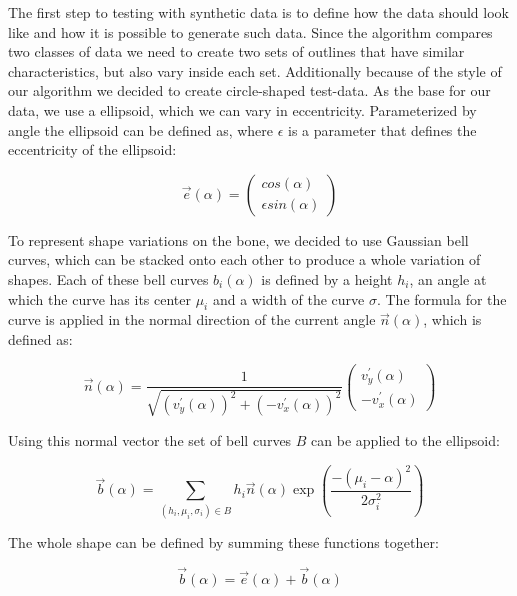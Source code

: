 \documentclass[pdftex,12pt,a4paper]{report}
\begin{document}
The first step to testing with synthetic data is to define how the data should look like and how it is possible to generate such data. Since the algorithm compares two classes of data we need to create two sets of outlines that have similar characteristics, but also vary inside each set. Additionally because of the style of our algorithm we decided to create circle-shaped test-data. As the base for our data, we use a ellipsoid, which we can vary in eccentricity. Parameterized by angle the ellipsoid can be defined as, where $\epsilon$ is a parameter that defines the eccentricity of the ellipsoid:

\begin{equation}
	\vec{e}(\alpha) = \left( \begin{array}{c}
		cos(\alpha) \\
		\epsilon sin(\alpha)
	\end{array} \right) 
\end{equation}

To represent shape variations on the bone, we decided to use Gaussian bell curves, which can be stacked onto each other to produce a whole variation of shapes. Each of these bell curves $b_i(\alpha)$ is defined by a height $h_i$, an angle at which the curve has its center $\mu_i$ and a width of the curve $\sigma$. The formula for the curve is applied in the normal direction of the current angle $\vec{n}(\alpha)$, which is defined as:

\begin{equation}
	\vec{n}(\alpha) = \frac{1}{\sqrt{(v_y^\prime(\alpha))^2 + (-v_x^\prime(\alpha))^2}}\left( \begin{array}{c}
		v_y^\prime(\alpha) \\
		-v_x^\prime(\alpha)
	\end{array} \right)
\end{equation}

Using this normal vector the set of bell curves $B$ can be applied to the ellipsoid:

\begin{equation}
	\vec{b}(\alpha) = \sum_{(h_i, \mu_i, \sigma_i) \in B}h_i \vec{n}(\alpha) \exp\left(\frac{-(\mu_i - \alpha)^2}{2 \sigma_i^2} \right )
\end{equation}

The whole shape can be defined by summing these functions together:

\begin{equation}
	\vec{b}(\alpha) = \vec{e}(\alpha) + \vec{b}(\alpha)
\end{equation}
\end{document}
